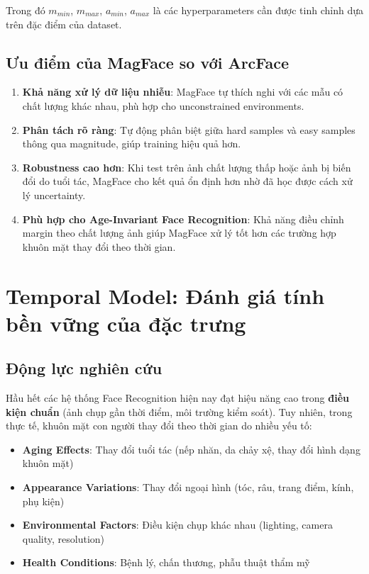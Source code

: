 Trong đó $m_{min}$, $m_{max}$, $a_{min}$, $a_{max}$ là các hyperparameters cần được tinh chỉnh dựa trên đặc điểm của dataset.

\subsection{Ưu điểm của MagFace so với ArcFace}

\begin{enumerate}
    \item \textbf{Khả năng xử lý dữ liệu nhiễu}: MagFace tự thích nghi với các mẫu có chất lượng khác nhau, phù hợp cho unconstrained environments.
    
    \item \textbf{Phân tách rõ ràng}: Tự động phân biệt giữa hard samples và easy samples thông qua magnitude, giúp training hiệu quả hơn.
    
    \item \textbf{Robustness cao hơn}: Khi test trên ảnh chất lượng thấp hoặc ảnh bị biến đổi do tuổi tác, MagFace cho kết quả ổn định hơn nhờ đã học được cách xử lý uncertainty.
    
    \item \textbf{Phù hợp cho Age-Invariant Face Recognition}: Khả năng điều chỉnh margin theo chất lượng ảnh giúp MagFace xử lý tốt hơn các trường hợp khuôn mặt thay đổi theo thời gian.
\end{enumerate}

\section{Temporal Model: Đánh giá tính bền vững của đặc trưng}

\subsection{Động lực nghiên cứu}

Hầu hết các hệ thống Face Recognition hiện nay đạt hiệu năng cao trong \textbf{điều kiện chuẩn} (ảnh chụp gần thời điểm, môi trường kiểm soát). Tuy nhiên, trong thực tế, khuôn mặt con người thay đổi theo thời gian do nhiều yếu tố:

\begin{itemize}
    \item \textbf{Aging Effects}: Thay đổi tuổi tác (nếp nhăn, da chảy xệ, thay đổi hình dạng khuôn mặt)
    \item \textbf{Appearance Variations}: Thay đổi ngoại hình (tóc, râu, trang điểm, kính, phụ kiện)
    \item \textbf{Environmental Factors}: Điều kiện chụp khác nhau (lighting, camera quality, resolution)
    \item \textbf{Health Conditions}: Bệnh lý, chấn thương, phẫu thuật thẩm mỹ
\end{itemize}


